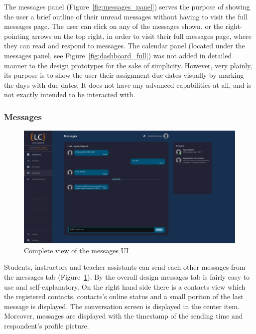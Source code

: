 \documentclass[a4paper, 12pt]{article}
\begin{document}
    The messages panel (Figure~\ref{fig:messages_panel}) serves the purpose of showing the user a brief outline of their unread messages
    without having to visit the full messages page. The user can click on any of the messages shown, or the right-pointing arrows on the top right,
    in order to visit their full messages page, where they can read and respond to messages.
    The calendar panel (located under the messages panel, see Figure~\ref{fig:dashboard_full}) was not added in detailed manner
    to the design prototypes for the sake of simplicity.
    However, very plainly, its purpose is to show the user their assignment due dates visually by marking the days with due dates. 
    It does not have any advanced capabilities at all, and is not exactly intended to be interacted with.
    
    \pagebreak
    \subsubsection{Messages}
    
    \begin{figure}[H]
        \centering
        \includegraphics[width=\textwidth]{messages}
        \caption{Complete view of the messages UI}
        \label{fig:messages_full}
    \end{figure}
    
    Students, instructors and teacher assistants can send each other messages from the messages tab (Figure~\ref{fig:messages_full}). By the overall design messages tab is fairly easy to use and
    self-explanatory. On the right hand side there is a contacts view which the registered contacts, contacts's online status and a small poriton of the last message is displayed.
    The conversation screen is displayed in the center item. Moreover, messages are displayed with the timestamp of the sending time and respondent's profile picture. 
    
\end{document}
